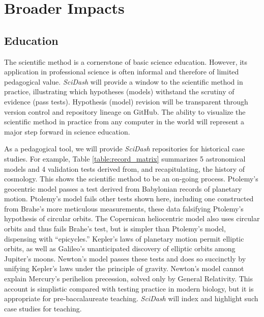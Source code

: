 \documentclass[11pt,letterpaper]{article}
\begin{document}
\section{Broader Impacts}
\label{sec:broader_impacts}
\subsection{Education}
\label{sec:education}
The scientific method is a cornerstone of basic science education.  However, its application in professional science is often informal and therefore of limited pedagogical value.    \textit{SciDash} will provide a window to the scientific method in practice, illustrating which hypotheses (models) withstand the scrutiny of evidence (pass tests).  Hypothesis (model) revision will be transparent through version control and repository lineage on GitHub.  The ability to visualize the scientific method in practice from any computer in the world will represent a major step forward in science education.  

As a pedagogical tool, we will provide \textit{SciDash} repositories for historical case studies.  For example, Table \ref{table:record_matrix} summarizes 5 astronomical models and 4 validation tests derived from, and recapitulating, the history of cosmology.  This shows the scientific method to be an on-going process.  Ptolemy's geocentric model\cite{ptolemy_almagest_150} passes a test derived from Babylonian records of planetary motion.  Ptolemy's model fails other tests shown here, including one constructed from Brahe's more meticulous measurements\cite{kepler_rudolphine_1627}, these data falsifying Ptolemy's hypothesis of circular orbits.  The Copernican heliocentric model\cite{copernicus_revolutionibus_1543} also uses circular orbits and thus fails Brahe's test, but is simpler than Ptolemy's model, dispensing with ``epicycles.''  Kepler's laws of planetary motion permit elliptic orbits\cite{kepler_astronomia_1609}, as well as Galileo's unanticipated discovery of elliptic orbits among Jupiter's moons\cite{galilei_siderius_1610}.  Newton's model passes these tests and does so succinctly by unifying Kepler's laws under the principle of gravity\cite{newton_philosophiae_1687}.  Newton's model cannot explain Mercury's perihelion precession\cite{le_verrier_lettre_1859}, solved only by General Relativity\cite{einstein_foundation_1916}.  This account is simplistic compared with testing practice in modern biology, but it is appropriate for pre-baccalaureate teaching.  \textit{SciDash} will index and highlight such case studies for teaching.  
\end{document}
